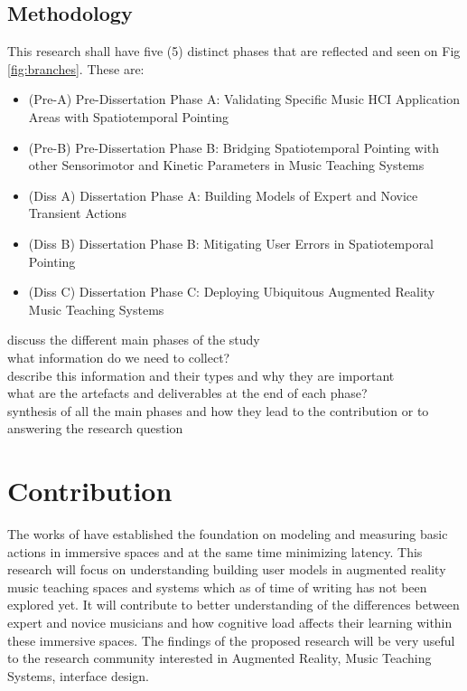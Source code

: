 \documentclass{article}
\begin{document}
\subsection{Methodology}
This research shall have five (5) distinct phases that are reflected and seen on Fig \ref{fig:branches}. These are:
\begin{itemize}
    \item (Pre-A) Pre-Dissertation Phase A: Validating Specific Music HCI Application Areas with Spatiotemporal Pointing
    \item (Pre-B) Pre-Dissertation Phase B: Bridging Spatiotemporal Pointing with other Sensorimotor and Kinetic Parameters in Music Teaching Systems
    \item (Diss A) Dissertation Phase A: Building Models of Expert and Novice Transient Actions
    \item (Diss B) Dissertation Phase B: Mitigating User Errors in Spatiotemporal Pointing
    \item (Diss C) Dissertation Phase C: Deploying Ubiquitous Augmented Reality Music Teaching Systems
    
\end{itemize}

discuss the different main phases of the study\\
what information do we need to collect?\\
describe this information and their types and why they are important\\
what are the artefacts and deliverables at the end of each phase?\\
synthesis of all the main phases and how they lead to the contribution or to answering the research question\\
\section{Contribution}
The works of \cite{liao2020button, lee2019geometrically} have established the foundation on modeling and measuring basic actions in immersive spaces and at the same time minimizing latency. This research will focus on understanding building user models in augmented reality music teaching spaces and systems which as of time of writing has not been explored yet. It will contribute to better understanding of the differences between expert and novice musicians and how cognitive load affects their learning within these immersive spaces. The findings of the proposed research will be very useful to the research community interested in Augmented Reality, Music Teaching Systems, interface design. 




\end{document}
